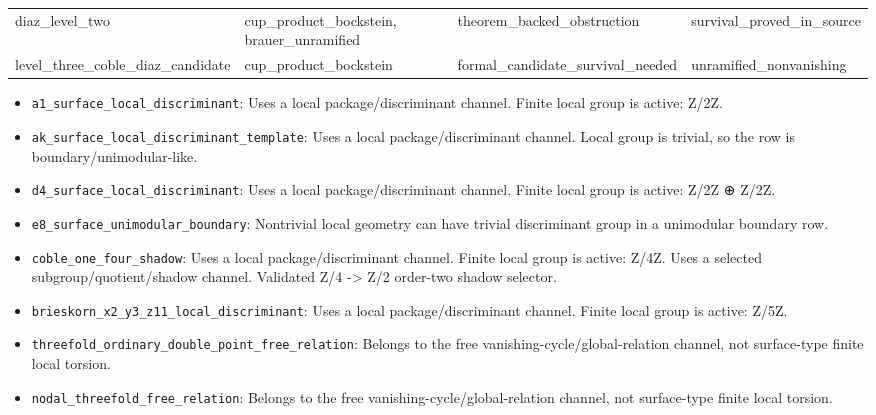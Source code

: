 \begin{table}[h]
\begin{tabular}{|p{}|p{}|p{}|p{}|}
diaz\_\allowbreak{}level\_\allowbreak{}two & cup\_\allowbreak{}product\_\allowbreak{}bockstein, brauer\_\allowbreak{}unramified & theorem\_\allowbreak{}backed\_\allowbreak{}obstruction & survival\_\allowbreak{}proved\_\allowbreak{}in\_\allowbreak{}source \\
level\_\allowbreak{}three\_\allowbreak{}coble\_\allowbreak{}diaz\_\allowbreak{}candidate & cup\_\allowbreak{}product\_\allowbreak{}bockstein & formal\_\allowbreak{}candidate\_\allowbreak{}survival\_\allowbreak{}needed & unramified\_\allowbreak{}nonvanishing \\
\hline
\end{tabular}
\end{table}

\begin{itemize}
\item \texttt{a1\_\allowbreak{}surface\_\allowbreak{}local\_\allowbreak{}discriminant}: Uses a local package/discriminant channel. Finite local group is active: Z/2Z.
\item \texttt{ak\_\allowbreak{}surface\_\allowbreak{}local\_\allowbreak{}discriminant\_\allowbreak{}template}: Uses a local package/discriminant channel. Local group is trivial, so the row is boundary/unimodular-like.
\item \texttt{d4\_\allowbreak{}surface\_\allowbreak{}local\_\allowbreak{}discriminant}: Uses a local package/discriminant channel. Finite local group is active: Z/2Z ⊕ Z/2Z.
\item \texttt{e8\_\allowbreak{}surface\_\allowbreak{}unimodular\_\allowbreak{}boundary}: Nontrivial local geometry can have trivial discriminant group in a unimodular boundary row.
\item \texttt{coble\_\allowbreak{}one\_\allowbreak{}four\_\allowbreak{}shadow}: Uses a local package/discriminant channel. Finite local group is active: Z/4Z. Uses a selected subgroup/quotient/shadow channel. Validated Z/4 -> Z/2 order-two shadow selector.
\item \texttt{brieskorn\_\allowbreak{}x2\_\allowbreak{}y3\_\allowbreak{}z11\_\allowbreak{}local\_\allowbreak{}discriminant}: Uses a local package/discriminant channel. Finite local group is active: Z/5Z.
\item \texttt{threefold\_\allowbreak{}ordinary\_\allowbreak{}double\_\allowbreak{}point\_\allowbreak{}free\_\allowbreak{}relation}: Belongs to the free vanishing-cycle/global-relation channel, not surface-type finite local torsion.
\item \texttt{nodal\_\allowbreak{}threefold\_\allowbreak{}free\_\allowbreak{}relation}: Belongs to the free vanishing-cycle/global-relation channel, not surface-type finite local torsion.

\end{itemize}
